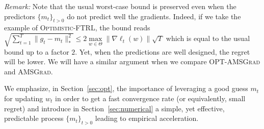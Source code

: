 \documentclass[11pt]{article}
\theoremstyle{k}
\begin{document}
\textit{Remark:} Note that the usual worst-case bound is preserved even when the predictors $\{m_{t}\}_{t>0}$ do not predict well the gradients. Indeed, if we take the example of \textsc{Optimistic-FTRL}, the bound reads $\sqrt{\sum_{t=1}^T \| g_t - m_t \|_*^2 } \leq 2 \max \limits_{w \in \Theta} \| \nabla \ell_t(w) \| \sqrt{T}$ which is equal to the usual bound up to a factor $2$. Yet, when the predictions are well designed, the regret will be lower. We will have a similar argument when we compare \textsc{OPT-AMSGrad} and \textsc{AMSGrad}.

We emphasize, in Section~\ref{sec:opt}, the importance of leveraging a good guess $m_t$ for updating $w_t$ in order to get a fast convergence rate (or equivalently, small regret) and introduce in Section~\ref{sec:numerical} a simple, yet effective, predictable process $\{m_{t}\}_{t>0}$ leading to empirical acceleration.
\end{document}
